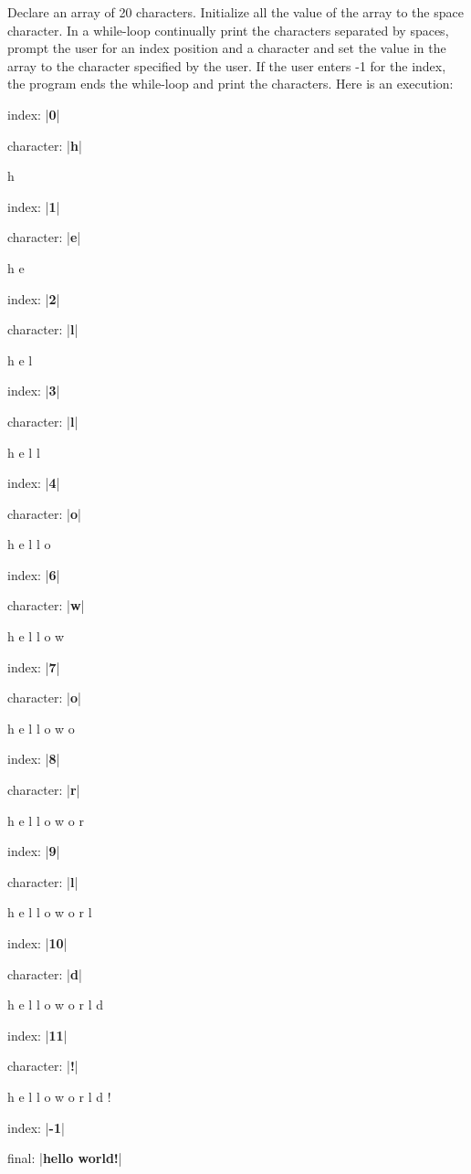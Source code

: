 Declare an array of 20 characters. Initialize all the value of the array to the space character. In a while-loop continually print the characters separated by spaces, prompt the user for an index position and a character and set the value in the array to the character specified by the user. If the user enters -1 for the index, the program ends the while-loop and print the characters. Here is an execution:



\begin{consolethree}[escapeinside=||]

index: |\textbf{0}|

character: |\textbf{h}|



h

index: |\textbf{1}|

character: |\textbf{e}|



h e

index: |\textbf{2}|

character: |\textbf{l}|



h e l

index: |\textbf{3}|

character: |\textbf{l}|



h e l l

index: |\textbf{4}|

character: |\textbf{o}|



h e l l o

index: |\textbf{6}|

character: |\textbf{w}|



h e l l o   w

index: |\textbf{7}|

character: |\textbf{o}|



h e l l o   w o

index: |\textbf{8}|

character: |\textbf{r}|



h e l l o   w o r

index: |\textbf{9}|

character: |\textbf{l}|



h e l l o   w o r l

index: |\textbf{10}|

character: |\textbf{d}|



h e l l o   w o r l d

index: |\textbf{11}|

character: |\textbf{!}|



h e l l o   w o r l d !

index: |\textbf{-1}|

final: |\textbf{hello world!}|

\end{consolethree}

